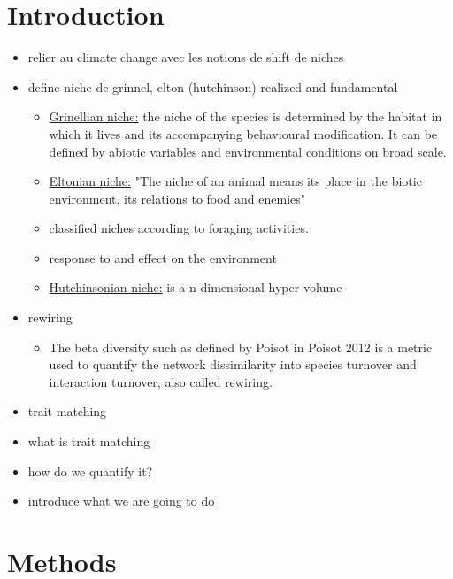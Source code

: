 \documentclass{article}
\begin{document}
\section{Introduction}

\begin{itemize}
    \item relier au climate change avec les notions de shift de niches
    \item define niche de grinnel, elton (hutchinson) realized and fundamental
    \begin{itemize}
        \item \underline{Grinellian niche:} the niche of the species is determined by the habitat in which it lives and its accompanying behavioural modification. It can be defined by abiotic variables and environmental conditions on broad scale.
        \item \underline{Eltonian niche:} "The niche of an animal means its place in the biotic environment, its relations to food and enemies"
        \item classified niches according to foraging activities.
        \item response to and effect on the environment
        \item \underline{Hutchinsonian niche:} is a n-dimensional hyper-volume
    \end{itemize}
    \item rewiring
    \begin{itemize}
        \item The beta diversity such as defined by Poisot in Poisot 2012 is a metric used to quantify the network  dissimilarity into species turnover and interaction turnover, also called rewiring.
    \end{itemize}
    \item trait matching
        \item what is trait matching
        \item how do we quantify it?
    \item introduce what we are going to do
\end{itemize}










\section{Methods}
\end{document}
